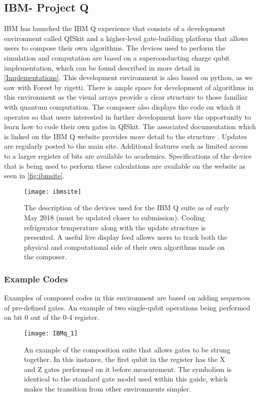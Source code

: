 \subsection{IBM- Project Q}
IBM has launched the IBM Q experience that consists of a development environment called QISkit and a higher-level gate-building platform that allows users to compose their own algorithms. The devices used to perform the simulation and computation are based on a superconducting charge qubit implementation, which can be found described in more detail in \autoref{Implementations}.  This development environment is also based on python, as we saw with Forest by rigetti. There is ample space for development of algorithms in this environment as the visual arrays provide a clear structure to those familiar with quantum computation. The composer also displays the code on which it operates so that users interested in further development have the opportunity to learn how to code their own gates in QISkit. The associated documentation which is linked on the IBM Q website provides more detail to the structure \cite{coles2018quantum}. Updates are regularly posted to the main site. Additional features such as limited access to a larger register of bits are available to academics. Specifications of the device that is being used to perform these calculations are available on the website as seen in \autoref{fig:ibmsite}. 

\begin{figure}[h!]
\centering
\texttt{[image: ibmsite]}
\caption{The description of the devices used for the IBM Q suite as of early May 2018 (must be updated closer to submission). Cooling refrigerator temperature along with the update structure is presented. A useful live display feed allows users to track both the physical and computational side of their own algorithms made on the composer.}
\label{fig:ibmsite}
\end{figure}

\subsubsection{Example Codes}
Examples of composed codes in this environment are based on adding sequences of pre-defined gates. An example of two single-qubit operations being performed on bit 0 out of the 0-4 register.  
\begin{figure}[h!]
\centering
\texttt{[image: IBMq\_1]}
\caption{An example of the composition suite that allows gates to be strung together. In this instance, the first qubit in the register has the X and Z gates performed on it before measurement. The symbolism is identical to the standard gate model used within this guide, which makes the transition from other environments simpler.}
\end{figure}
